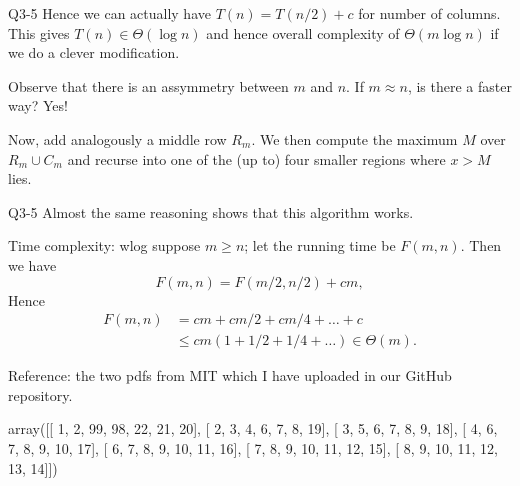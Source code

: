 \documentclass{scratcl}
\def\le{\leqslant}
\def\ge{\geqslant}
\begin{document}
\begin{frame}{Q3-5}
  Hence we can actually have $T(n) = T(n/2)+c$ for number of columns. This gives $T(n) \in \Theta(\log{n})$ and hence overall complexity of $\Theta(m\log{n})$ if we do a clever modification. 
  \par Observe that there is an assymmetry between $m$ and $n$. If $m \approx n$, is there a faster way? Yes!
  \begin{center}
  \end{center}
  \par Now, add analogously a middle row $R_m$. We then compute the maximum $M$ over $R_m \cup C_m$ and recurse into one of the (up to) four smaller regions where $x>M$ lies. 
\end{frame}
\begin{frame}{Q3-5}
  Almost the same reasoning shows that this algorithm works. 
  \par Time complexity: wlog suppose $m \ge n$; let the running time be $F(m, n)$. Then we have
  \[F(m, n) = F(m/2, n/2)+cm, \]
  Hence
  \begin{align*}
    F(m, n) &= cm+cm/2+cm/4+\dots +c  \\ &\le cm(1+1/2+1/4+\dots) \in \Theta(m).
  \end{align*}
  \par Reference: the two pdfs from MIT which I have uploaded in our GitHub repository. 
\end{frame}
array([[ 1,  2, 99, 98, 22, 21, 20],
       [ 2,  3,  4,  6,  7,  8, 19],
       [ 3,  5,  6,  7,  8,  9, 18],
       [ 4,  6,  7,  8,  9, 10, 17],
       [ 6,  7,  8,  9, 10, 11, 16],
       [ 7,  8,  9, 10, 11, 12, 15],
       [ 8,  9, 10, 11, 12, 13, 14]])
\fi
\end{document}
